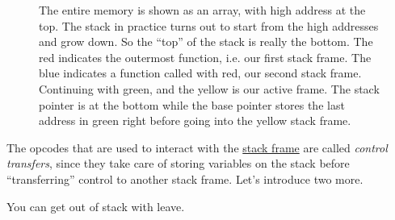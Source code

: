 \begin{figure}[H]
    \caption{The entire memory is shown as an array, with high address at the top. The stack in practice turns out to start from the high addresses and grow down. So the ``top'' of the stack is really the bottom. The red indicates the outermost function, i.e. our first stack frame. The blue indicates a function called with red, our second stack frame. Continuing with green, and the yellow is our active frame. The stack pointer is at the bottom while the base pointer stores the last address in green right before going into the yellow stack frame.}
  \end{figure}

  \begin{example}[]
    \label{ex:stack-memory}
    
  \end{example}

  \begin{example}[]
    \label{ex:stack-memory-2}
    
  \end{example}

  \begin{example}[]
    \label{ex:stack-memory-3}
    
  \end{example}

  The opcodes that are used to interact with the \hyperref[def:stack-frame]{stack frame} are called \textit{control transfers}, since they take care of storing variables on the stack before ``transferring'' control to another stack frame. Let's introduce two more. 

  \begin{definition}[Continue]
    \label{def:continue}
    
  \end{definition}

  \begin{definition}[Leave]
    \label{def:leave}
    You can get out of stack with leave.
  \end{definition}

